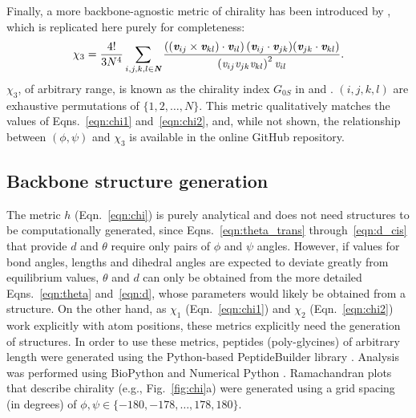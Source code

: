 \documentclass[fleqn,10pt,lineno]{wlpeerj} %
\newcommand{\Fig}[1]{Fig.~\ref{#1}}
\newcommand{\Eqn}[1]{Eqn.~\ref{#1}}
\newcommand{\Eqns}[1]{Eqns.~\ref{#1}}
\newcommand{\h}{h}
\begin{document}
Finally, a more backbone-agnostic metric of chirality has been introduced by \cite{Solymosi2002}, which is replicated here purely for completeness:
\begin{equation}\label{eqn:chi3}
\displaystyle \chi_3 = \frac{4!}{3N^4} \sum_{i,j,k,l \in \textit{\textbf{N}}} \frac{\left((\textit{\textbf{v}}_{ij} \times \textit{\textbf{v}}_{kl}) \cdot \textit{\textbf{v}}_{il}\right) (\textit{\textbf{v}}_{ij} \cdot \textit{\textbf{v}}_{jk}) (\textit{\textbf{v}}_{jk} \cdot \textit{\textbf{v}}_{kl})} {\left(\textit{v}_{ij} \textit{v}_{jk} \textit{v}_{kl}\right)^2 \textit{v}_{il}}.
\end{equation}
$\chi_3$, of arbitrary range, is known as the chirality index $G_{0S}$ in \cite{Solymosi2002} and \cite{Neal2003}. $(i,j,k,l)$ are exhaustive permutations of $\{1,2,\ldots,N\}$. This metric qualitatively matches the values of \Eqns{eqn:chi1} and~\ref{eqn:chi2}, and, while not shown, the relationship between $(\phi,\psi)$ and $\chi_3$ is available in the online GitHub repository.

\subsection*{Backbone structure generation}
The metric $\h$ (\Eqn{eqn:chi}) is purely analytical and does not need structures to be computationally generated, since \Eqns{eqn:theta_trans} through~\ref{eqn:d_cis} that provide $d$ and $\theta$ require only pairs of $\phi$ and $\psi$ angles. However, if values for bond angles, lengths and dihedral angles are expected to deviate greatly from equilibrium values, $\theta$ and $d$ can only be obtained from the more detailed \Eqns{eqn:theta} and~\ref{eqn:d}, whose parameters would likely be obtained from a structure. On the other hand, as $\chi_1$ (\Eqn{eqn:chi1}) and $\chi_2$ (\Eqn{eqn:chi2}) work explicitly with atom positions, these metrics explicitly need the generation of structures. In order to use these metrics, peptides (poly-glycines) of arbitrary length were generated using the Python-based PeptideBuilder library \citep{Tien2013}. 
Analysis was performed using BioPython \citep{Cock2009} and Numerical Python \citep{VanDerWalt2011}. Ramachandran plots that describe chirality (e.g., \Fig{fig:chi}a) were generated using a grid spacing (in degrees) of $\phi,\psi \in \{-180,-178,\ldots,178,180\}$.
\end{document}
